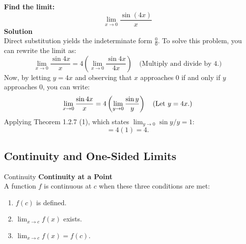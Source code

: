 \documentclass[12pt]{article}
\theoremstyle{beautifulthm}
\begin{document}
\begin{tcolorbox}[colback=examplebg, colframe=red!75!black, title=\textbf{EXAMPLE 9: The Limit of a Rational Function}, fonttitle=\bfseries, sharp corners]
\textbf{Find the limit:}
\[
\lim_{x \to 0} \frac{\sin (4x)}{x}
\]
\tcblower
\textbf{Solution} \\
Direct substitution yields the indeterminate form \( \frac{0}{0} \). To solve this problem, you can rewrite the limit as:
\[
\lim_{x \to 0} \frac{\sin 4x}{x} = 4 \left( \lim_{x \to 0} \frac{\sin 4x}{4x} \right) \quad \text{(Multiply and divide by 4.)}
\]
Now, by letting \( y = 4x \) and observing that \( x \) approaches 0 if and only if \( y \) approaches 0, you can write:
\[
\lim_{x \to 0} \frac{\sin 4x}{x} = 4 \left( \lim_{y \to 0} \frac{\sin y}{y} \right) \quad \text{(Let \( y = 4x \).)}
\]
Applying Theorem 1.2.7 (1), which states \( \lim_{y \to 0} \sin y / y = 1 \):
\[
= 4(1) = 4.
\]
\end{tcolorbox}







\newpage

\subsection{Continuity and One-Sided Limits}
\begin{Definition}{ Continuity}{}
\textbf{Continuity at a Point}\\
A function \(f\) is continuous at \(c\) when these three conditions are met:
\begin{enumerate}
    \item \(f(c)\) is defined.
    \item \(\lim_{x \to c} f(x)\) exists.
    \item \(\lim_{x \to c} f(x) = f(c)\).
\end{enumerate}


\end{Definition}
\end{document}
